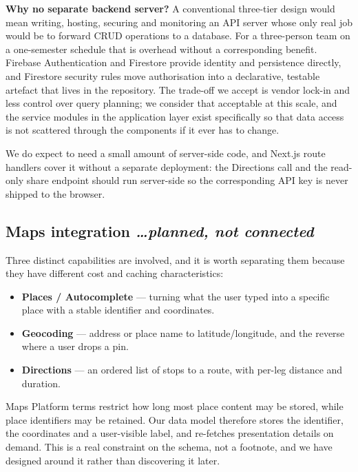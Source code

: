 \documentclass[11pt,a4paper]{article}
\newcommand{\BvrHint}[1]{%
  {\normalfont\normalsize\itshape\hfill #1}}
\begin{document}
\textbf{Why no separate backend server?} A conventional
three-tier design would mean writing, hosting,
securing and monitoring an API server whose only real
job would be to forward CRUD operations to a database.
For a three-person team on a one-semester schedule that
is overhead without a corresponding benefit. Firebase
Authentication and Firestore provide identity and
persistence directly, and Firestore security rules move
authorisation into a declarative, testable artefact
that lives in the repository. The trade-off we accept
is vendor lock-in and less control over query planning;
we consider that acceptable at this scale, and the
service modules in the application layer exist
specifically so that data access is not scattered
through the components if it ever has to change.

We do expect to need a small amount of server-side
code, and Next.js route handlers cover it without a
separate deployment: the Directions call and the
read-only share endpoint should run server-side so the
corresponding API key is never shipped to the browser.

\subsection{Maps integration %
\BvrHint{\ldots planned, not connected}}
Three distinct capabilities are involved, and it is
worth separating them because they have different cost
and caching characteristics:

\begin{itemize}[leftmargin=0.7cm]
    \item \textbf{Places / Autocomplete} --- turning
      what the user typed into a specific place with a
      stable identifier and coordinates.
    \item \textbf{Geocoding} --- address or place name
      to latitude/longitude, and the reverse where a
      user drops a pin.
    \item \textbf{Directions} --- an ordered list of
      stops to a route, with per-leg distance and
      duration.
\end{itemize}

Maps Platform terms restrict how long most place
content may be stored, while place identifiers may be
retained. Our data model therefore stores the
identifier, the coordinates and a user-visible label,
and re-fetches presentation details on demand. This is
a real constraint on the schema, not a footnote, and we
have designed around it rather than discovering it
later.
\end{document}
